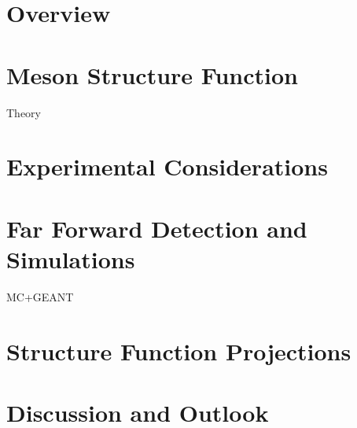 \label{Chapter-9}

\hypertarget{Section-9.1}{%
\section{Overview}\label{Section-9.1}}

\hypertarget{Section-9.2}{%
\section{Meson Structure Function}\label{Section-9.2}}

Theory

\hypertarget{Section-9.3}{%
\section{Experimental Considerations}\label{Section-9.3}}

\hypertarget{Section-9.4}{%
\section{Far Forward Detection and Simulations}\label{Section-9.4}}

MC+GEANT

\hypertarget{Section-9.5}{%
\section{Structure Function Projections}\label{Section-9.5}}

\hypertarget{Section-9.6}{%
\section{Discussion and Outlook}\label{Section-9.6}}


